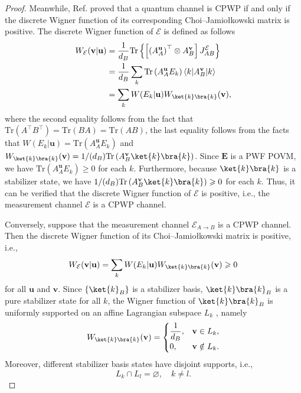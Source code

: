 \documentclass[aps,pra,twocolumn,floatfix,amsfonts,10pt]{revtex4-2}
\begin{document}
\begin{proof}
	Meanwhile, Ref. \cite{WWS2019} proved that a quantum channel is CPWP if and only if the discrete Wigner function of its corresponding Choi–Jamiołkowski matrix is positive.
	The discrete Wigner function of $\mathcal{E}$ is defined as follows
	\begin{equation}
		\begin{aligned}
			W_{\mathcal{E}}(\mathbf{v}|\mathbf{u}) &= \frac{1}{d_B} \mathrm{Tr}\left\{ \left[\left(A_A^{\mathbf{u}}\right)^{\top} \otimes A_B^{\mathbf{v}}\right]J_{AB}^{\mathcal{E}}\right\} \\ &= \frac{1}{d_B} \displaystyle\sum_{k}\mathrm{Tr}\left(A_A^{\mathbf{u}}E_k\right) \langle k|A_B^{\mathbf{v}}|k \rangle \\ &= \displaystyle\sum_{k} W(E_k|\mathbf{u})W_{\ket{k}\bra{k}}(\mathbf{v}),
		\end{aligned}
	\end{equation}
	where the second equality follows from the fact that $\mathrm{Tr}(A^{\top}B^{\top}) = \mathrm{Tr}(BA) = \mathrm{Tr}(AB)$, the last equality follows from the facts that $W(E_k|\mathbf{u}) = \mathrm{Tr}\left(A_A^{\mathbf{u}}E_k\right)$ and $W_{\ket{k}\bra{k}}(\mathbf{v}) = 1/(d_B)\mathrm{Tr}\left(A_B^{\mathbf{v}}\ket{k}\bra{k}\right)$.
	Since $\mathbf{E}$ is a PWF POVM, we have $\mathrm{Tr}\left(A_A^{\mathbf{u}}E_k\right) \geqslant 0$ for each $k$.
	Furthermore, because $\ket{k}\bra{k}$ is a stabilizer state, we have $1/(d_B)\mathrm{Tr}\left(A_B^{\mathbf{v}}\ket{k}\bra{k}\right) \geqslant 0$ for each $k$.
	Thus, it can be verified that the discrete Wigner function of $\mathcal{E}$ is positive, i.e., the measurement channel $\mathcal{E}$ is a CPWP channel.
	
	Conversely, suppose that the measurement channel $\mathcal{E}_{A \rightarrow B}$ is a CPWP channel.
	Then the discrete Wigner function of its Choi--Jamiołkowski matrix is positive, i.e.,
	\begin{equation}
		W_{\mathcal{E}}(\mathbf{v}|\mathbf{u}) = \displaystyle\sum_{k} W(E_k|\mathbf{u})W_{\ket{k}\bra{k}}(\mathbf{v}) \geqslant 0
	\end{equation}
	for all $\mathbf{u}$ and $\mathbf{v}$.
	Since $\{\ket{k}_B\}$ is a stabilizer basis, $\ket{k}\bra{k}_B$ is a pure stabilizer state for all $k$, the Wigner function of $\ket{k}\bra{k}_B$ is uniformly supported on an affine Lagrangian subspace $L_k$ \cite{W1987,G2006}, namely
	\begin{equation}
		W_{\ket{k}\bra{k}}(\mathbf{v}) =
		\begin{cases}
			\dfrac{1}{d_B}, & \mathbf{v}\in L_k,\\[4pt] 0, & \mathbf{v}\notin L_k.
		\end{cases}
	\end{equation}
	Moreover, different stabilizer basis states have disjoint supports, i.e.,
	\begin{equation}
		L_k\cap L_l=\varnothing,\quad k\neq l.
	\end{equation}
	

\end{proof}
\end{document}
